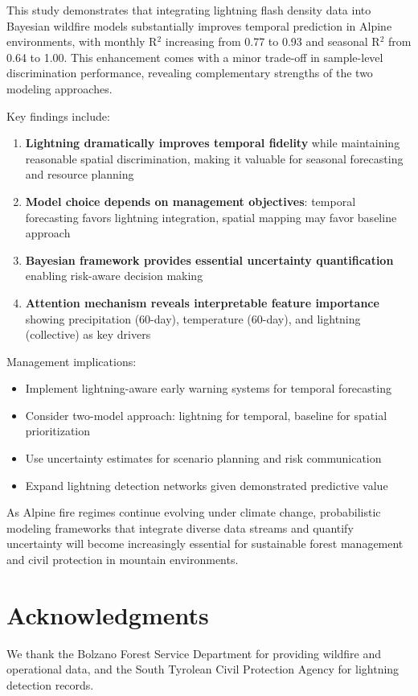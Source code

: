 \documentclass[11pt,a4paper]{article}
\begin{document}
This study demonstrates that integrating lightning flash density data into Bayesian wildfire models substantially improves temporal prediction in Alpine environments, with monthly R$^2$ increasing from 0.77 to 0.93 and seasonal R$^2$ from 0.64 to 1.00. This enhancement comes with a minor trade-off in sample-level discrimination performance, revealing complementary strengths of the two modeling approaches.

Key findings include:

\begin{enumerate}
    \item \textbf{Lightning dramatically improves temporal fidelity} while maintaining reasonable spatial discrimination, making it valuable for seasonal forecasting and resource planning
    \item \textbf{Model choice depends on management objectives}: temporal forecasting favors lightning integration, spatial mapping may favor baseline approach
    \item \textbf{Bayesian framework provides essential uncertainty quantification} enabling risk-aware decision making
    \item \textbf{Attention mechanism reveals interpretable feature importance} showing precipitation (60-day), temperature (60-day), and lightning (collective) as key drivers
\end{enumerate}

Management implications:
\begin{itemize}
    \item Implement lightning-aware early warning systems for temporal forecasting
    \item Consider two-model approach: lightning for temporal, baseline for spatial prioritization
    \item Use uncertainty estimates for scenario planning and risk communication
    \item Expand lightning detection networks given demonstrated predictive value
\end{itemize}

As Alpine fire regimes continue evolving under climate change, probabilistic modeling frameworks that integrate diverse data streams and quantify uncertainty will become increasingly essential for sustainable forest management and civil protection in mountain environments.

\section*{Acknowledgments}
We thank the Bolzano Forest Service Department for providing wildfire and operational data, and the South Tyrolean Civil Protection Agency for lightning detection records.
\end{document}
